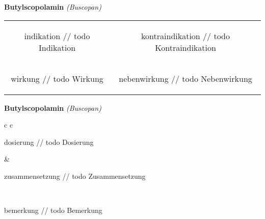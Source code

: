 \documentclass[12pt]{beamer}
\begin{document}
\begin{frame}{
    \textbf{Butylscopolamin}
    \textit{(Buscopan)}
}
    \begin{tabular}{c c}
        \begin{beamercolorbox}[wd=\boxwidth\textwidth,ht=\boxheight\textheight,sep=1em]{indikation}
        // todo Indikation
        \end{beamercolorbox} & 
        \begin{beamercolorbox}[wd=\boxwidth\textwidth,ht=\boxheight\textheight,sep=1em]{kontraindikation}
        // todo Kontraindikation 
        \end{beamercolorbox} \\
        \begin{beamercolorbox}[wd=\boxwidth\textwidth,ht=\boxheight\textheight,sep=1em]{wirkung}
        // todo Wirkung
        \end{beamercolorbox} & 
        \begin{beamercolorbox}[wd=\boxwidth\textwidth,ht=\boxheight\textheight,sep=1em]{nebenwirkung}
        // todo Nebenwirkung
        \end{beamercolorbox} \\
    \end{tabular}
\end{frame}

\begin{frame}{
    \textbf{Butylscopolamin}
    \textit{(Buscopan)}
}
    \begin{tabular}{c c}
        \begin{beamercolorbox}[wd=\boxwidth\textwidth,ht=\boxheight\textheight,sep=1em]{dosierung}
        // todo Dosierung
        \end{beamercolorbox} & 
        \begin{beamercolorbox}[wd=\boxwidth\textwidth,ht=\boxheight\textheight,sep=1em]{zusammensetzung}
        // todo Zusammensetzung
        \end{beamercolorbox} \\
        \begin{beamercolorbox}[wd=\textwidth,ht=\boxheight\textheight,sep=1em]{bemerkung}
        // todo Bemerkung
        \end{beamercolorbox} \\
    \end{tabular}
\end{frame}
\end{document}
